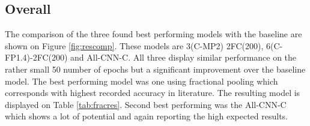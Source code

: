 \documentclass[12pt]{article}
\begin{document}
\subsection*{Overall}

The comparison of the three found best performing models with the baseline are shown on Figure \ref{fig:rescomp}. These models are 3(C-MP2) 2FC(200), 6(C-FP1.4)-2FC(200) and All-CNN-C. All three display similar performance on the rather small 50 number of epochs but a significant improvement over the baseline model. The best performing model was one using fractional pooling which corresponds with highest recorded accuracy in literature\cite{frac}. The resulting model is displayed on Table \ref{tab:fracres}. Second best performing was the All-CNN-C which shows a lot of potential and again reporting the high expected results\cite{allconv}. 
\end{document}
